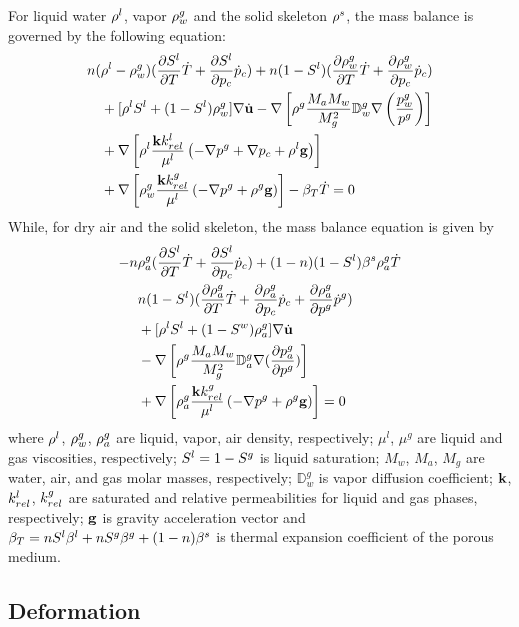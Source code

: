 For liquid water $\rho^l$, vapor $\rho_w^g$ and the solid skeleton $\rho^s$, the mass balance is governed by the following equation:
\begin{align}
n(&\rho^l-\rho_w^g)(\dfrac{\partial S^l}{\partial T}{\dot T}
+
\dfrac{\partial S^l}{\partial p_c}{\dot {p}}_c)
+
n(1-S^l)(\dfrac{\partial \rho_w^g}{\partial T}{\dot T}
+
\dfrac{\partial \rho_w^g}{\partial p_c}{\dot {p}}_c)
\nonumber\\
&+
[\rho^lS^l+(1-S^l)\rho_w^g]\nabla{\dot {\mathbf u}}
-
\nabla\left[\rho^g\dfrac{M_a M_w}{M_g^2}\mathbb{D}_w^g\nabla\left(\dfrac{p_w^g}{p^g}\right)\right]
\nonumber\\
&+
\nabla\left[\rho^l\dfrac{\mathbf kk_{rel}^l}{\mu^l}\left(-\nabla p^g+\nabla p_c+\rho^l \mathbf g \right)\right]
\nonumber\\
&+
\nabla\left[\rho_w^g\dfrac{\mathbf kk_{rel}^g}{\mu^l}\left(-\nabla p^g+\rho^g\mathbf g\right)\right]-\beta_T\dot T
=
0
\end{align}
While, for dry air and the solid skeleton, the mass balance equation is given by
\begin{align}
-
n&\rho_a^g(\dfrac{\partial S^l}{\partial T}{\dot T}
+
\dfrac{\partial S^l}{\partial p_c}{\dot {p}}_c)
+
(1-n)(1-S^l)\beta^s\rho_a^g{\dot T}
\nonumber\\
&n(1-S^l)(\dfrac{\partial \rho_a^g}{\partial T}{\dot T}
+
\dfrac{\partial \rho_a^g}{\partial p_c}{\dot {p}}_c
+
\dfrac{\partial \rho_a^g}{\partial p^g}{\dot {p}}^g)
\nonumber\\
&+
[\rho^lS^l+(1-S^w)\rho_a^g]\nabla{\dot {\mathbf u}}
\nonumber\\
&-
\nabla\left[\rho^g\dfrac{M_a M_w}{M_g^2}\mathbb{D}_a^g \nabla(\dfrac{\partial p_a^g}{\partial p^g})\right]
\nonumber\\
&+
\nabla\left[\rho_a^g \dfrac{\mathbf kk_{rel}^g}{\mu^l}\left(-\nabla p^g+\rho^g\mathbf g\right)\right]
=
0
\end{align}
where
$\rho^l$, $\rho_w^g$, $\rho_a^g$ are liquid, vapor, air density, respectively;
$\mu^l$, $\mu^g$ are liquid and gas viscosities, respectively;
$S^l = 1 -S^g$ is liquid saturation;
$M_w$, $M_a$, $M_g$ are water, air, and gas molar masses, respectively;
$\mathbb{D}_w^g$ is vapor diffusion coefficient;
$\mathbf k$, $k_{rel}^l$, $k_{rel}^g$ are saturated and relative permeabilities for liquid and gas phases, respectively;
$\mathbf g$ is gravity acceleration vector and
$\beta_T = nS^l\beta^l + nS^g\beta^g + (1-n)\beta^s$ is thermal expansion coefficient of the porous medium.

\subsection{Deformation}

